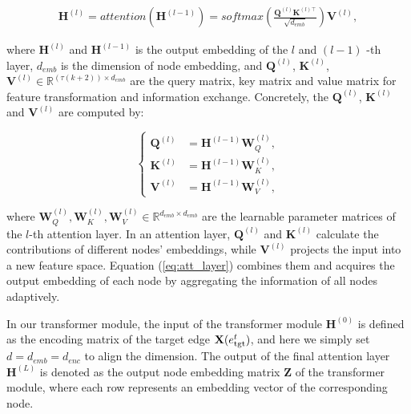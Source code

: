 \documentclass[10pt,journal,compsoc]{IEEEtran}
\newcommand{\HL}{}
\begin{document}
\begin{equation}
\label{eq:att_layer}
\begin{aligned}
\mathbf{H}^{(l)} =attention\left(\mathbf{H}^{(l-1)}\right)=softmax\left(\frac{\mathbf{Q}^{(l)} \mathbf{K}^{(l)\top}}{\sqrt{d_{emb}}}\right) \mathbf{V}^{(l)},
\end{aligned}
\end{equation}

\noindent where $\mathbf{H}^{(l)}$ and $\mathbf{H}^{(l-1)}$ is the output embedding of the $l$ and $(l-1)$ -th layer, $d_{emb}$ is the dimension of node embedding, and $\mathbf{Q}^{(l)}$, $\mathbf{K}^{(l)}$, $\mathbf{V}^{(l)} \in \mathbb{R}^{(\tau (k + 2)) \times d_{emb}}$ are the query matrix, key matrix and value matrix \HL{for feature transformation and information exchange}. Concretely, the $\mathbf{Q}^{(l)}$, $\mathbf{K}^{(l)}$ and $\mathbf{V}^{(l)}$ are computed by:

\begin{equation}
\label{eq:att_weight}
\left\{\begin{aligned}
\mathbf{Q}^{(l)} &=\mathbf{H}^{(l-1)} \mathbf{W}_{Q}^{(l)}, \\
\mathbf{K}^{(l)} &=\mathbf{H}^{(l-1)} \mathbf{W}_{K}^{(l)}, \\
\mathbf{V}^{(l)} &=\mathbf{H}^{(l-1)} \mathbf{W}_{V}^{(l)},
\end{aligned}\right.
\end{equation}

\noindent where $\mathbf{W}_{Q}^{(l)}, \mathbf{W}_{K}^{(l)}, \mathbf{W}_{V}^{(l)} \in \mathbb{R}^{d_{emb} \times d_{emb}}$ are the learnable parameter matrices of the $l$-th attention layer. \HL{In an attention layer, $\mathbf{Q}^{(l)}$ and $\mathbf{K}^{(l)}$ calculate the contributions of different nodes' embeddings, while $\mathbf{V}^{(l)}$ projects the input into a new feature space. Equation (\ref{eq:att_layer}) combines them and acquires the output embedding of each node by aggregating the information of all nodes adaptively.}

\HL{In our transformer module}, the input of the transformer module $\mathbf{H}^{(0)}$ is defined as the encoding matrix of the target edge $\mathbf{X}(e^t_{\rm tgt})$, and here we simply set $d = d_{emb} = d_{enc}$ to align the dimension. The output of the final attention layer $\mathbf{H}^{(L)}$ is denoted as the output node embedding matrix $\mathbf{Z}$ of the transformer module, where each row represents an embedding vector of the corresponding node.
\end{document}
